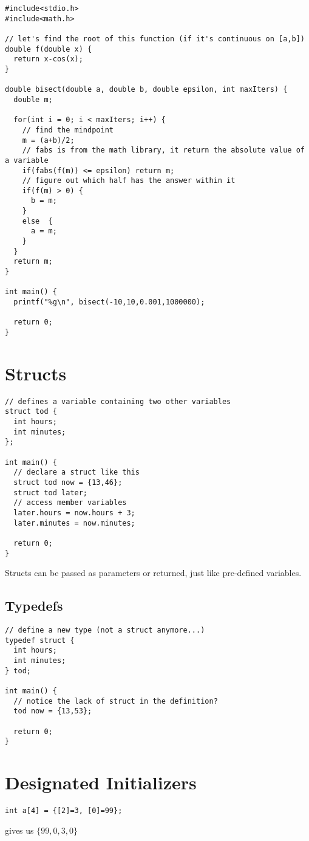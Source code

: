 \documentclass[12pt]{article}
\begin{document}
\begin{verbatim}
#include<stdio.h>
#include<math.h>

// let's find the root of this function (if it's continuous on [a,b])
double f(double x) {
  return x-cos(x);
}

double bisect(double a, double b, double epsilon, int maxIters) {
  double m;

  for(int i = 0; i < maxIters; i++) {
    // find the mindpoint
    m = (a+b)/2;
    // fabs is from the math library, it return the absolute value of a variable
    if(fabs(f(m)) <= epsilon) return m;
    // figure out which half has the answer within it
    if(f(m) > 0) {
      b = m;
    }
    else  {
      a = m;
    }
  }
  return m;
}

int main() {
  printf("%g\n", bisect(-10,10,0.001,1000000);
  
  return 0;
}
\end{verbatim}

\section*{Structs}
\begin{verbatim}
// defines a variable containing two other variables
struct tod {
  int hours;
  int minutes;
};

int main() {
  // declare a struct like this
  struct tod now = {13,46};
  struct tod later;
  // access member variables
  later.hours = now.hours + 3;
  later.minutes = now.minutes;
  
  return 0;
}
\end{verbatim}
Structs can be passed as parameters or returned, just like pre-defined variables.

\subsection*{Typedefs}
\begin{verbatim}
// define a new type (not a struct anymore...)
typedef struct {
  int hours;
  int minutes;
} tod;

int main() {
  // notice the lack of struct in the definition?
  tod now = {13,53};
  
  return 0;
}
\end{verbatim}

\section*{Designated Initializers}
\begin{verbatim}int a[4] = {[2]=3, [0]=99};\end{verbatim} gives us $\{99,0,3,0\}$
\end{document}
